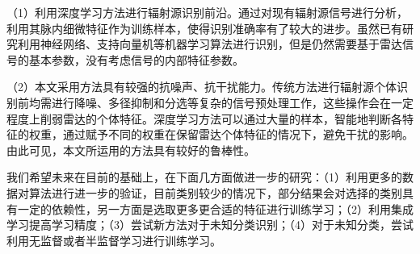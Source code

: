 （1）利用深度学习方法进行辐射源识别前沿。通过对现有辐射源信号进行分析，利用其脉内细微特征作为训练样本，使得识别准确率有了较大的进步。虽然已有研究利用神经网络、支持向量机等机器学习算法进行识别，但是仍然需要基于雷达信号的基本参数，没有考虑信号的内部特征参数。

（2）本文采用方法具有较强的抗噪声、抗干扰能力。传统方法进行辐射源个体识别前均需进行降噪、多径抑制和分选等复杂的信号预处理工作，这些操作会在一定程度上削弱雷达的个体特征。深度学习方法可以通过大量的样本，智能地判断各特征的权重，通过赋予不同的权重在保留雷达个体特征的情况下，避免干扰的影响。由此可见，本文所运用的方法具有较好的鲁棒性。

我们希望未来在目前的基础上，在下面几方面做进一步的研究：（1）利用更多的数据对算法进行进一步的验证，目前类别较少的情况下，部分结果会对选择的类别具有一定的依赖性，另一方面是选取更多更合适的特征进行训练学习；（2）利用集成学习提高学习精度；（3）尝试新方法对于未知分类识别；（4）对于未知分类，尝试利用无监督或者半监督学习进行训练学习。


